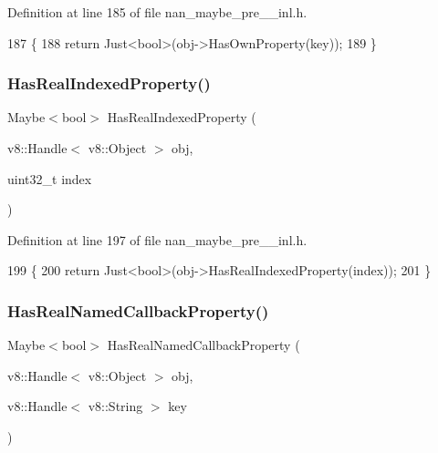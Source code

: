 Definition at line 185 of file nan\+\_\+maybe\+\_\+pre\+\_\+\_\+inl.\+h.


\begin{DoxyCode}
187                             \{
188   \textcolor{keywordflow}{return} Just<bool>(obj->HasOwnProperty(key));
189 \}
\end{DoxyCode}
\mbox{\label{nan__maybe__pre__43__inl_8h_a613dca1c736bd7d15a44e7dccbde3d8c}} 
\subsubsection{Has\+Real\+Indexed\+Property()}
{\footnotesize\ttfamily Maybe$<$bool$>$ Has\+Real\+Indexed\+Property (\begin{DoxyParamCaption}\item[{v8\+::\+Handle$<$ v8\+::\+Object $>$}]{obj,  }\item[{uint32\+\_\+t}]{index }\end{DoxyParamCaption})}



Definition at line 197 of file nan\+\_\+maybe\+\_\+pre\+\_\+\_\+inl.\+h.


\begin{DoxyCode}
199                     \{
200   \textcolor{keywordflow}{return} Just<bool>(obj->HasRealIndexedProperty(index));
201 \}
\end{DoxyCode}
\mbox{\label{nan__maybe__pre__43__inl_8h_a5803f8a26eb69cd7ba85471f09c4d551}} 
\subsubsection{Has\+Real\+Named\+Callback\+Property()}
{\footnotesize\ttfamily Maybe$<$bool$>$ Has\+Real\+Named\+Callback\+Property (\begin{DoxyParamCaption}\item[{v8\+::\+Handle$<$ v8\+::\+Object $>$}]{obj,  }\item[{v8\+::\+Handle$<$ v8\+::\+String $>$}]{key }\end{DoxyParamCaption})}




